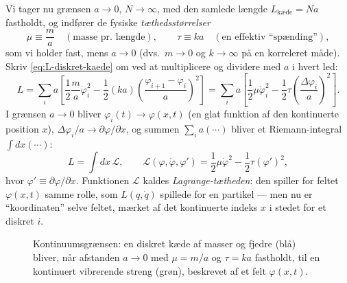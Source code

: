 Vi tager nu grænsen $a\to0$, $N\to\infty$, med den samlede længde
$L_{\text{kæde}}=Na$ fastholdt, og indfører de fysiske
\emph{tæthedsstørrelser}
\begin{equation}
  \mu \equiv \frac{m}{a} \quad(\text{masse pr.\ længde}), \qquad
  \tau \equiv ka \quad(\text{en effektiv ``spænding''}),
\end{equation}
som vi holder fast, mens $a\to0$ (dvs.\ $m\to0$ og $k\to\infty$ på en
korreleret måde). Skriv \eqref{eq:L-diskret-kaede} om ved at
multiplicere og dividere med $a$ i hvert led:
\begin{equation}
  L = \sum_i a\left[\frac{1}{2}\frac{m}{a}\dot\varphi_i^2
      - \frac12 (ka)\left(\frac{\varphi_{i+1}-\varphi_i}{a}\right)^2\right]
    = \sum_i a\left[\frac12\mu\dot\varphi_i^2 - \frac12\tau\left(\frac{\Delta\varphi_i}{a}\right)^2\right].
\end{equation}
I grænsen $a\to0$ bliver $\varphi_i(t)\to\varphi(x,t)$ (en glat
funktion af den kontinuerte position $x$), $\Delta\varphi_i/a\to
\partial\varphi/\partial x$, og summen $\sum_i a(\cdots)$ bliver et
Riemann-integral $\int dx(\cdots)$:
\begin{equation}
  \boxed{L = \int dx\,\mathcal{L}, \qquad
  \mathcal{L}(\varphi,\dot\varphi,\varphi') = \frac12\mu\dot\varphi^2 - \frac12\tau(\varphi')^2,}
  \label{eq:L-tætthed-streng}
\end{equation}
hvor $\varphi'\equiv\partial\varphi/\partial x$. Funktionen
$\mathcal{L}$ kaldes \emph{Lagrange-tætheden}: den spiller for feltet
$\varphi(x,t)$ samme rolle, som $L(q,\dot q)$ spillede for en
partikel — men nu er ``koordinaten'' selve feltet, mærket af det
kontinuerte indeks $x$ i stedet for et diskret $i$.

\begin{figure}[htbp]
  \centering
  \caption{Kontinuumsgrænsen: en diskret kæde af masser og fjedre
  (blå) bliver, når afstanden $a\to0$ med $\mu=m/a$ og $\tau=ka$
  fastholdt, til en kontinuert vibrerende streng (grøn), beskrevet af
  et felt $\varphi(x,t)$.}
  \label{fig:kaede-til-streng}
\end{figure}

